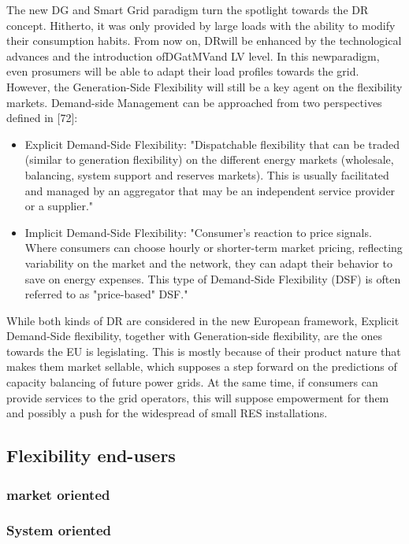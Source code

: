 The new DG and Smart Grid paradigm turn the spotlight towards the DR concept. Hitherto, it
was only provided by large loads with the ability to modify their consumption habits. From now
on, DRwill be enhanced by the technological advances and the introduction ofDGatMVand LV
level. In this newparadigm, even prosumers will be able to adapt their load profiles towards the
grid. However, the Generation-Side Flexibility will still be a key agent on the flexibility markets. Demand-side Management can be approached from two perspectives defined in [72]:
\begin{itemize}
\item Explicit Demand-Side Flexibility: "Dispatchable flexibility that can be traded (similar to generation
flexibility) on the different energy markets (wholesale, balancing, system support and reserves
markets). This is usually facilitated and managed by an aggregator that may be an independent
service provider or a supplier."
\item Implicit Demand-Side Flexibility: "Consumer's reaction to price signals. Where consumers
can choose hourly or shorter-term market pricing, reflecting variability on the market and the network,
they can adapt their behavior to save on energy expenses. This type of Demand-Side Flexibility
(DSF) is often referred to as "price-based" DSF."
\end{itemize}

While both kinds of DR are considered in the new European framework, Explicit Demand-Side
flexibility, together with Generation-side flexibility, are the ones towards the EU is legislating.
This is mostly because of their product nature that makes them market sellable, which supposes
a step forward on the predictions of capacity balancing of future power grids. At the same time,
if consumers can provide services to the grid operators, this will suppose empowerment for
them and possibly a push for the widespread of small RES installations.

\subsection{Flexibility end-users}
\subsubsection{market oriented}
\subsubsection{System oriented}

